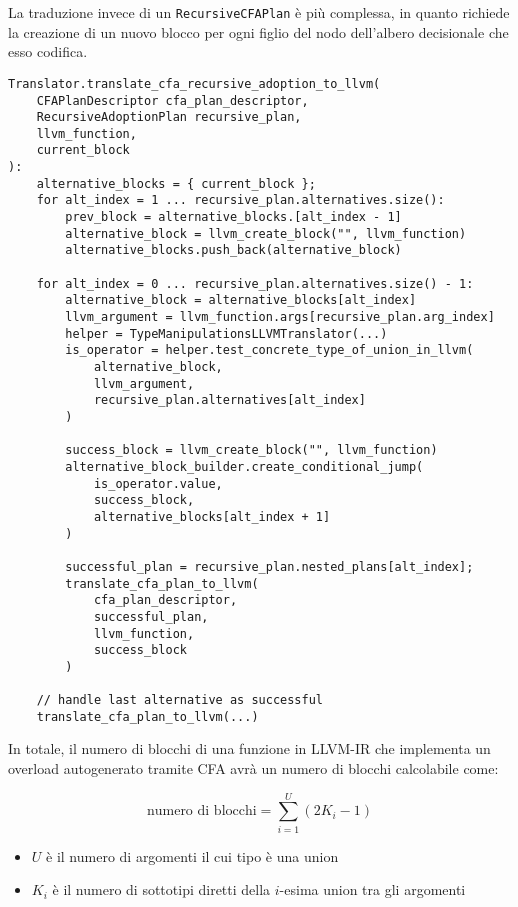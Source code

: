 La traduzione invece di un \texttt{RecursiveCFAPlan} è più complessa, in quanto
richiede la creazione di un nuovo blocco per ogni figlio del nodo dell'albero 
decisionale che esso codifica. \\

\vspace{0.4cm}
\begin{lstlisting}[frame=single]
Translator.translate_cfa_recursive_adoption_to_llvm(
    CFAPlanDescriptor cfa_plan_descriptor, 
    RecursiveAdoptionPlan recursive_plan,
    llvm_function,
    current_block
):
    alternative_blocks = { current_block };
    for alt_index = 1 ... recursive_plan.alternatives.size():
        prev_block = alternative_blocks.[alt_index - 1]
        alternative_block = llvm_create_block("", llvm_function)
        alternative_blocks.push_back(alternative_block)

    for alt_index = 0 ... recursive_plan.alternatives.size() - 1:
        alternative_block = alternative_blocks[alt_index]
        llvm_argument = llvm_function.args[recursive_plan.arg_index]
        helper = TypeManipulationsLLVMTranslator(...)
        is_operator = helper.test_concrete_type_of_union_in_llvm(
            alternative_block, 
            llvm_argument, 
            recursive_plan.alternatives[alt_index]
        )
        
        success_block = llvm_create_block("", llvm_function)
        alternative_block_builder.create_conditional_jump(
            is_operator.value, 
            success_block, 
            alternative_blocks[alt_index + 1]
        )

        successful_plan = recursive_plan.nested_plans[alt_index];
        translate_cfa_plan_to_llvm(
            cfa_plan_descriptor, 
            successful_plan, 
            llvm_function, 
            success_block
        )
    
    // handle last alternative as successful
    translate_cfa_plan_to_llvm(...)
\end{lstlisting}

\newpage

In totale, il numero di blocchi di una funzione in LLVM-IR che implementa 
un overload autogenerato tramite CFA avrà un numero di blocchi calcolabile come:

\begin{equation*}
    \text{numero di blocchi} = \sum_{i=1}^{U} (2K_i - 1)
\end{equation*}

\begin{itemize}
    \item $U$ è il numero di argomenti il cui tipo è una union
    \item $K_i$ è il numero di sottotipi diretti della $i$-esima union tra gli argomenti
\end{itemize}

